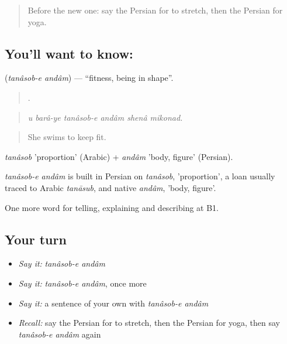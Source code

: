 \label{lesson:FA-C516-tanasob-e-andam}



\begin{quote}
Before the new one: say the Persian for to stretch, then the Persian for yoga.
\end{quote}

\subsection*{You'll want to know:  }
\textbf{ } (\emph{tanâsob-e andâm}) — \textquotedblleft{}fitness, being in shape\textquotedblright{}.

\begin{quote}
     .
\end{quote}

\begin{quote}
\emph{u barâ-ye tanâsob-e andâm shenâ mikonad.}
\end{quote}

\begin{quote}
She swims to keep fit.
\end{quote}

\emph{tanâsob} 'proportion' (Arabic) + \emph{andâm} 'body, figure' (Persian).

\begin{cousinweb}
\emph{tanâsob-e andâm} is built in Persian on \emph{tanâsob}, 'proportion', a loan usually traced to Arabic \emph{tanāsub}, and native \emph{andâm}, 'body, figure'.
\end{cousinweb}

\begin{grammarlens}[title={What you've built}]
One more word for telling, explaining and describing at B1.
\end{grammarlens}

\subsection*{Your turn}
\begin{itemize}
\raggedright
  \item \emph{Say it:} \emph{tanâsob-e andâm}
  \item \emph{Say it:} \emph{tanâsob-e andâm}, once more
  \item \emph{Say it:} a sentence of your own with \emph{tanâsob-e andâm}
  \item \emph{Recall:} say the Persian for to stretch, then the Persian for yoga, then say \emph{tanâsob-e andâm} again
\end{itemize}


